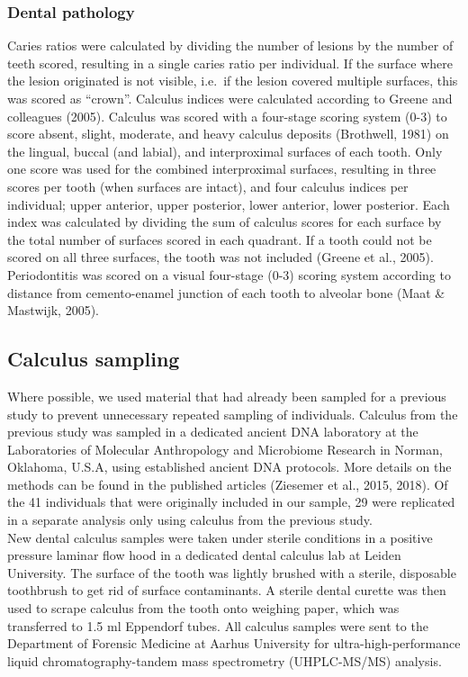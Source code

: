 \documentclass[
]{article}
\begin{document}
\subsubsection{Dental pathology}\label{dental-pathology}

Caries ratios were calculated by dividing the number of lesions by the
number of teeth scored, resulting in a single caries ratio per
individual. If the surface where the lesion originated is not visible,
i.e.~if the lesion covered multiple surfaces, this was scored as
``crown''. Calculus indices were calculated according to Greene and
colleagues (2005). Calculus was scored with a four-stage scoring system
(0-3) to score absent, slight, moderate, and heavy calculus deposits
(Brothwell, 1981) on the lingual, buccal (and labial), and interproximal
surfaces of each tooth. Only one score was used for the combined
interproximal surfaces, resulting in three scores per tooth (when
surfaces are intact), and four calculus indices per individual; upper
anterior, upper posterior, lower anterior, lower posterior. Each index
was calculated by dividing the sum of calculus scores for each surface
by the total number of surfaces scored in each quadrant. If a tooth
could not be scored on all three surfaces, the tooth was not included
(Greene et al., 2005). Periodontitis was scored on a visual four-stage
(0-3) scoring system according to distance from cemento-enamel junction
of each tooth to alveolar bone (Maat \& Mastwijk, 2005).

\subsection{Calculus sampling}\label{calculus-sampling}

Where possible, we used material that had already been sampled for a
previous study to prevent unnecessary repeated sampling of individuals.
Calculus from the previous study was sampled in a dedicated ancient DNA
laboratory at the Laboratories of Molecular Anthropology and Microbiome
Research in Norman, Oklahoma, U.S.A, using established ancient DNA
protocols. More details on the methods can be found in the published
articles (Ziesemer et al., 2015, 2018). Of the 41 individuals that were
originally included in our sample, 29 were replicated in a separate
analysis only using calculus from the previous study.\\
New dental calculus samples were taken under sterile conditions in a
positive pressure laminar flow hood in a dedicated dental calculus lab
at Leiden University. The surface of the tooth was lightly brushed with
a sterile, disposable toothbrush to get rid of surface contaminants. A
sterile dental curette was then used to scrape calculus from the tooth
onto weighing paper, which was transferred to 1.5 ml Eppendorf tubes.
All calculus samples were sent to the Department of Forensic Medicine at
Aarhus University for ultra-high-performance liquid
chromatography-tandem mass spectrometry (UHPLC-MS/MS) analysis.
\end{document}
